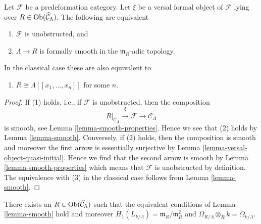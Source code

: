 \begin{lemma}
\label{lemma-smooth-power-series-classical}
Let $\mathcal{F}$ be a predeformation category.
Let $\xi$ be a versal formal object of $\mathcal{F}$ lying over
$R \in \mathop{\mathrm{Ob}}\nolimits(\widehat{\mathcal{C}}_\Lambda)$. The following are
equivalent
\begin{enumerate}
\item $\mathcal{F}$ is unobstructed, and
\item $\Lambda \to R$ is formally smooth in the $\mathfrak m_R$-adic topology.
\end{enumerate}
In the classical case these are also equivalent to
\begin{enumerate}
\item[(3)] $R \cong \Lambda[[x_1, \ldots, x_n]]$ for some $n$.\
\end{enumerate}
\end{lemma}

\begin{proof}
If (1) holds, i.e., if $\mathcal{F}$ is unobstructed, then the composition
$$
\underline{R}|_{\mathcal{C}_\Lambda}
\xrightarrow{\underline{\xi}}
\mathcal{F}
\to
\mathcal{C}_\Lambda
$$
is smooth, see Lemma \ref{lemma-smooth-properties}.
Hence we see that (2) holds by Lemma \ref{lemma-smooth}.
Conversely, if (2) holds, then the composition is smooth
and moreover the first arrow is essentially surjective by
Lemma \ref{lemma-versal-object-quasi-initial}. Hence we
find that the second arrow is smooth by Lemma \ref{lemma-smooth-properties}
which means that $\mathcal{F}$ is unobstructed by definition.
The equivalence with (3) in the classical case follows
from Lemma \ref{lemma-smooth}.
\end{proof}

\begin{lemma}
\label{lemma-exists-smooth}
There exists an $R \in \mathop{\mathrm{Ob}}\nolimits(\widehat{\mathcal{C}}_\Lambda)$
such that the equivalent conditions of Lemma \ref{lemma-smooth}
hold and moreover $H_1(L_{k/\Lambda}) = \mathfrak m_R/\mathfrak m_R^2$
and $\Omega_{R/\Lambda} \otimes_R k = \Omega_{k/\Lambda}$.
\end{lemma}

